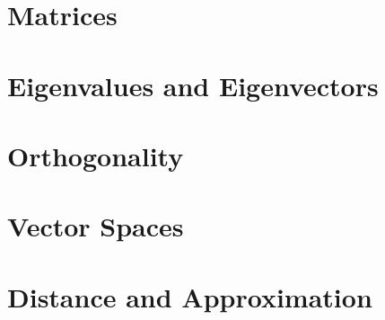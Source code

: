   \chapter{Matrices}
    
    
    
    
    
    
    

  \chapter{Eigenvalues and Eigenvectors}
    
    
    
    
    
    

  \chapter{Orthogonality}
    
    
    
    
    

  \chapter{Vector Spaces}
    
    
    
    
    
    
    

  \chapter{Distance and Approximation}
    
    
    
    
    



